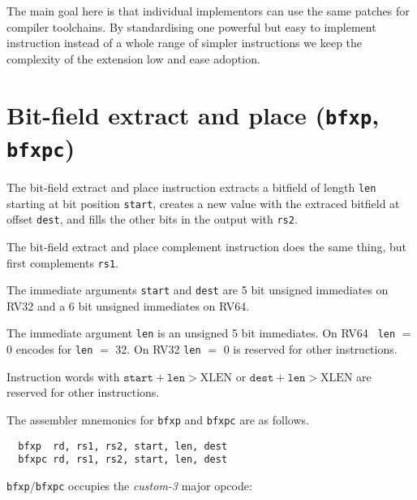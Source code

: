 The main goal here is that individual implementors can use the same patches for
compiler toolchains. By standardising one powerful but easy to implement
instruction instead of a whole range of simpler instructions we keep the
complexity of the extension low and ease adoption.

\section{Bit-field extract and place ({\tt bfxp}, {\tt bfxpc})}

The bit-field extract and place instruction extracts a bitfield of length
{\tt len} starting at bit position {\tt start}, creates a new value with
the extraced bitfield at offset {\tt dest}, and fills the other bits
in the output with {\tt rs2}.

The bit-field extract and place complement instruction does the same thing,
but first complements {\tt rs1}.

The immediate arguments {\tt start} and {\tt dest} are 5 bit unsigned
immediates on RV32 and a 6 bit unsigned immediates on RV64.

The immediate argument {\tt len} is an unsigned 5 bit immediates. On RV64 {\tt
len} $=$ 0 encodes for {\tt len} $=$ 32.  On RV32 {\tt len} $=$ 0 is reserved
for other instructions.

Instruction words with $\texttt{start}+\texttt{len}>\textrm{XLEN}$ or
$\texttt{dest}+\texttt{len}>\textrm{XLEN}$ are reserved for other instructions.



The assembler mnemonics for {\tt bfxp} and {\tt bfxpc} are as follows.

\begin{verbatim}
  bfxp  rd, rs1, rs2, start, len, dest
  bfxpc rd, rs1, rs2, start, len, dest
\end{verbatim}

{\tt bfxp}/{\tt bfxpc} occupies the {\it custom-3} major opcode:

